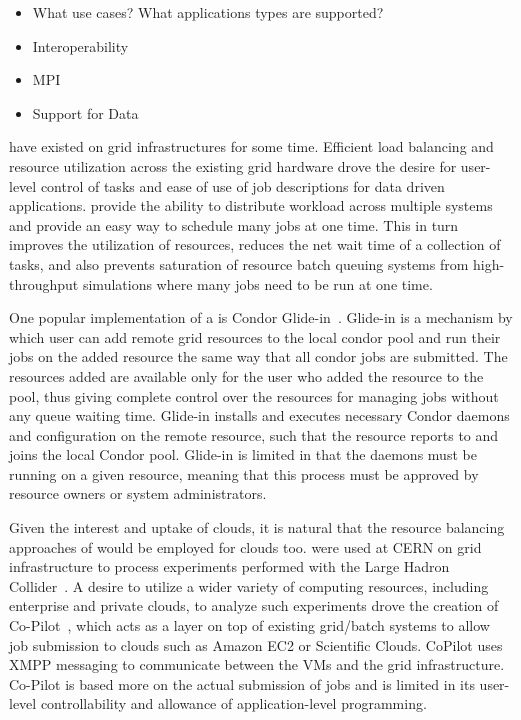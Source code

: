 \documentclass{sig-alternate}
\begin{document}

\begin{itemize}
	\item What use cases? What applications types are supported?
	\item Interoperability
	\item MPI 
	\item Support for Data
\end{itemize}

\pilotjobs have existed on grid infrastructures for some time. 
Efficient load balancing and resource utilization
across the existing grid hardware drove the desire for 
user-level control of tasks and ease of use of job descriptions for
data driven applications.  \pilotjobs provide the ability to 
distribute workload across multiple systems and
provide an easy way to schedule many jobs at one time. This in turn
improves the utilization of resources, reduces the net wait time of a
collection of tasks, and also prevents saturation of resource batch
queuing systems from high-throughput simulations where many jobs
need to be run at one time.

One popular implementation of a \pilotjob is Condor Glide-in~\cite{glidein}. Glide-in is a mechanism by which user can add remote grid resources to the local condor pool and run their jobs on the added resource the same way that all condor jobs are submitted. The resources added are available only for the user who added the resource to the pool, thus giving complete control over the resources for managing jobs without any queue waiting time. Glide-in installs and executes necessary Condor daemons and configuration on the remote resource, such that the resource reports to and joins the local Condor pool. Glide-in is limited in that the daemons must be running on a given resource, meaning that this process must be approved by resource owners or system administrators. 

Given the interest and uptake of clouds, it is natural that the resource
balancing approaches of \pilotjobs would be employed for clouds too.
\pilotjobs were used at CERN on grid infrastructure to process experiments 
performed with the Large Hadron Collider~\cite{copilot-tr}. 
A desire to utilize a wider variety of computing resources, including enterprise and private clouds, to analyze such experiments drove the creation 
of  Co-Pilot~\cite{copilot-tr}, which acts as a layer on top of existing
grid/batch systems to allow job submission to clouds such as Amazon
EC2 or Scientific Clouds. CoPilot uses XMPP messaging to communicate between
the VMs and the grid infrastructure. Co-Pilot is based more on the actual
submission of jobs and is limited in its user-level controllability and 
allowance of application-level programming.
\end{document}
